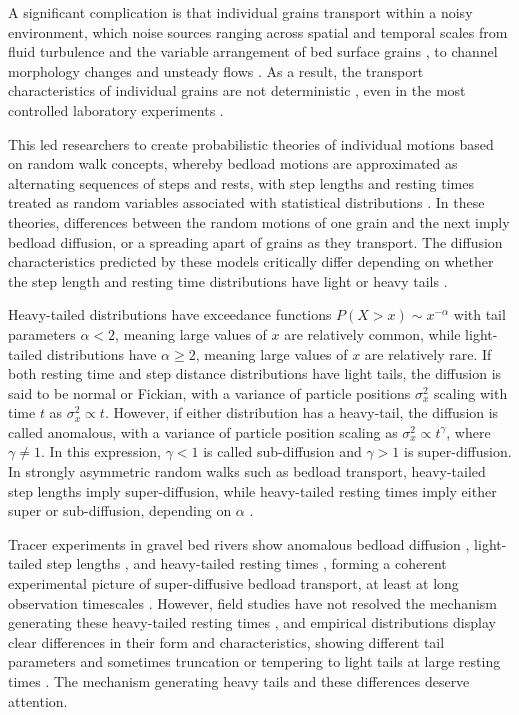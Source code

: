 \documentclass[draft]{agujournal2018}
\begin{document}
A significant complication is that individual grains transport within a noisy environment, which noise sources ranging across spatial and temporal scales from fluid turbulence \citep{Celik2014} and the variable arrangement of bed surface grains \citep{Gordon1972}, to channel morphology changes \citep{Hassan2017} and unsteady flows \citep{Phillips2013}.
As a result, the transport characteristics of individual grains are not deterministic \citep[e.g.][]{Einstein1937}, even in the most controlled laboratory experiments \citep[e.g.][]{Charru2004, Bohm2004, Fathel2015, Heyman2016}.

This led researchers to create probabilistic theories of individual motions based on random walk concepts, whereby bedload motions are approximated as alternating sequences of steps and rests, with step lengths and resting times treated as random variables associated with statistical distributions \citep{Einstein1937, Yano1969, Nakagawa1976, Hassan1991, Bradley2012}.
In these theories, differences between the random motions of one grain and the next imply bedload diffusion, or a spreading apart of grains as they transport.
The diffusion characteristics predicted by these models critically differ depending on whether the step length and resting time distributions have light or heavy tails \citep[e.g.][]{Bradley2017}.

Heavy-tailed distributions have exceedance functions $P(X>x) \sim x^{-\alpha}$ with tail parameters $\alpha < 2$, meaning large values of $x$ are relatively common, while light-tailed distributions have $\alpha \geq 2$, meaning large values of $x$ are relatively rare.
If both resting time and step distance distributions have light tails, the diffusion is said to be normal or Fickian, with a variance of particle positions $\sigma_x^2$
scaling with time $t$ as $\sigma_x^2 \propto t$.
However, if either distribution has a heavy-tail, the diffusion is called anomalous, with a variance of particle position scaling as $\sigma_x^2 \propto t^\gamma$, where $\gamma\neq 1$.
In this expression, $\gamma <1$ is called sub-diffusion and $\gamma > 1$ is super-diffusion.
In strongly asymmetric random walks such as bedload transport, heavy-tailed step lengths imply super-diffusion, while heavy-tailed resting times imply either super or sub-diffusion, depending on $\alpha$ \citep{Weeks1996, Weeks1998}.

Tracer experiments in gravel bed rivers show anomalous bedload diffusion \citep{Phillips2013, Bradley2017}, light-tailed step lengths \citep{Bradley2012, Hassan2013}, and heavy-tailed resting times \citep{Voepel2013, Olinde2015, Pretzlav2016, Bradley2017}, forming a coherent experimental picture of super-diffusive bedload transport, at least at long observation timescales \citep[e.g.][]{Nikora2002, Martin2012}.
However, field studies have not resolved the mechanism generating these heavy-tailed resting times \citep[e.g.][]{Bradley2017}, and empirical distributions display clear differences in their form and characteristics, showing different tail parameters \citep[e.g.][]{Olinde2015} and sometimes truncation \citep[e.g.][]{Bradley2017} or tempering to light tails at large resting times \citep[e.g.][]{Voepel2013}.
The mechanism generating heavy tails and these differences deserve attention.
\end{document}
